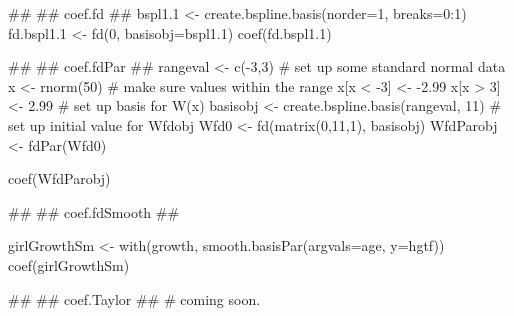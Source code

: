 \begin{Examples}
\begin{ExampleCode}
##
## coef.fd
##
bspl1.1 <- create.bspline.basis(norder=1, breaks=0:1)
fd.bspl1.1 <- fd(0, basisobj=bspl1.1)
coef(fd.bspl1.1)


##
## coef.fdPar 
##
rangeval <- c(-3,3)
#  set up some standard normal data
x <- rnorm(50)
#  make sure values within the range
x[x < -3] <- -2.99
x[x >  3] <-  2.99
#  set up basis for W(x)
basisobj <- create.bspline.basis(rangeval, 11)
#  set up initial value for Wfdobj
Wfd0 <- fd(matrix(0,11,1), basisobj)
WfdParobj <- fdPar(Wfd0)

coef(WfdParobj)


##
## coef.fdSmooth
##

girlGrowthSm <- with(growth, smooth.basisPar(argvals=age, y=hgtf))
coef(girlGrowthSm)


##
## coef.Taylor 
##
# coming soon.

\end{ExampleCode}
\end{Examples}

